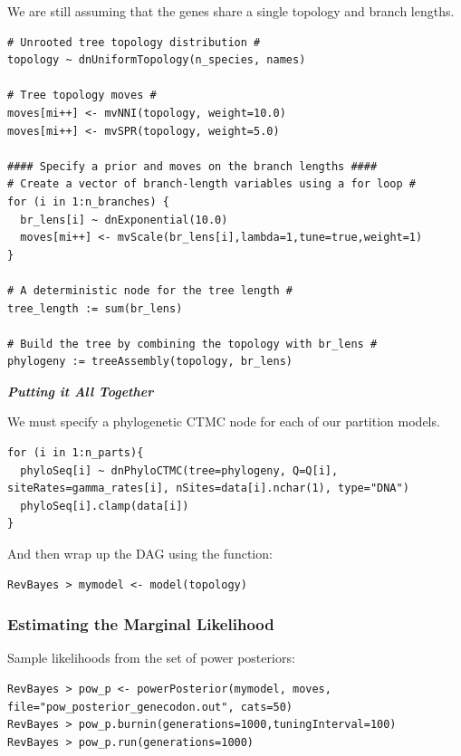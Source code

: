 We are still assuming that the genes share a single topology and branch lengths.
{\tt \begin{snugshade*}
\begin{lstlisting}
# Unrooted tree topology distribution #
topology ~ dnUniformTopology(n_species, names)

# Tree topology moves #
moves[mi++] <- mvNNI(topology, weight=10.0)
moves[mi++] <- mvSPR(topology, weight=5.0)

#### Specify a prior and moves on the branch lengths #### 
# Create a vector of branch-length variables using a for loop #
for (i in 1:n_branches) {
  br_lens[i] ~ dnExponential(10.0)
  moves[mi++] <- mvScale(br_lens[i],lambda=1,tune=true,weight=1) 
}

# A deterministic node for the tree length #
tree_length := sum(br_lens)

# Build the tree by combining the topology with br_lens #
phylogeny := treeAssembly(topology, br_lens)
\end{lstlisting}
\end{snugshade*}}

\textbf{\textit{Putting it All Together}}

We must specify a phylogenetic CTMC node for each of our partition models.
{\tt \begin{snugshade*}
\begin{lstlisting}
for (i in 1:n_parts){
  phyloSeq[i] ~ dnPhyloCTMC(tree=phylogeny, Q=Q[i], siteRates=gamma_rates[i], nSites=data[i].nchar(1), type="DNA")
  phyloSeq[i].clamp(data[i])
}
\end{lstlisting}
\end{snugshade*}}


And then wrap up the DAG using the  function:
{\tt \begin{snugshade*}
\begin{lstlisting}
RevBayes > mymodel <- model(topology)
\end{lstlisting}
\end{snugshade*}}


\subsubsection*{Estimating the Marginal Likelihood}

Sample likelihoods from the set of power posteriors:
{\tt \begin{snugshade*}
\begin{lstlisting}
RevBayes > pow_p <- powerPosterior(mymodel, moves, file="pow_posterior_genecodon.out", cats=50) 
RevBayes > pow_p.burnin(generations=1000,tuningInterval=100)
RevBayes > pow_p.run(generations=1000)  
\end{lstlisting}
\end{snugshade*}}

